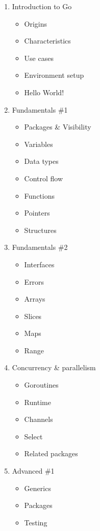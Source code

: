 \documentclass[
  digital,
  color,
  oneside,
  nosansbold,
  nocolorbold,
  lof,
  lot,
]{fithesis4}
\begin{document}
\begin{enumerate}
    \item Introduction to Go
    \begin{itemize}
        \item Origins
        \item Characteristics
        \item Use cases
        \item Environment setup
        \item Hello World!
    \end{itemize}
    \item Fundamentals \#1
    \begin{itemize}
        \item Packages \& Visibility
        \item Variables
        \item Data types
        \item Control flow
        \item Functions
        \item Pointers
        \item Structures
    \end{itemize}
    \item Fundamentals \#2
    \begin{itemize}
        \item Interfaces
        \item Errors
        \item Arrays
        \item Slices
        \item Maps
        \item Range
    \end{itemize}
    \item Concurrency \& parallelism
    \begin{itemize}
        \item Goroutines
        \item Runtime
        \item Channels
        \item Select
        \item Related packages
    \end{itemize}
    \item Advanced \#1
    \begin{itemize}
        \item Generics
        \item Packages
        \item Testing

\end{itemize}
\end{enumerate}
\end{document}
